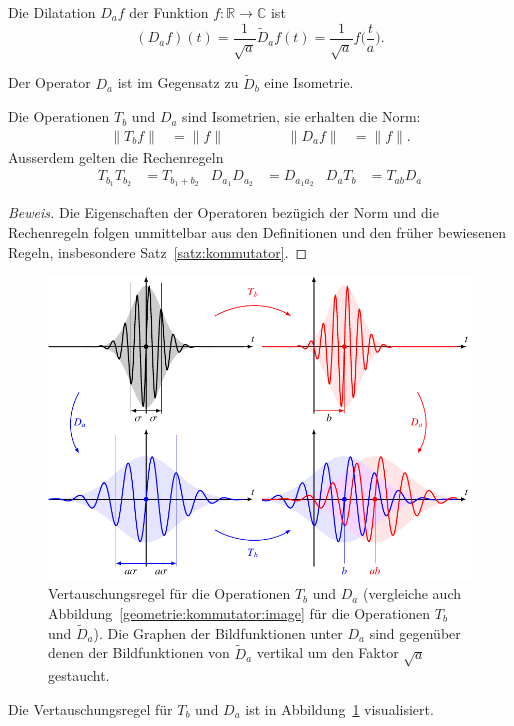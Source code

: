 \begin{definition}
Die Dilatation $D_af$ der Funktion $f\colon\mathbb R\to\mathbb C$ ist 
\[
(D_af)(t)
=
\frac{1}{\sqrt{a}} \tilde{D}_af(t)
=
\frac{1}{\sqrt{a}} f\biggl(\frac{t}{a}\biggr).
\]
\end{definition}
Der Operator $D_a$ ist im Gegensatz zu $\tilde{D}_b$ eine Isometrie.

\begin{satz}
Die Operationen $T_b$ und $D_a$ sind Isometrien, sie erhalten die
Norm:
\[
\begin{aligned}
\|T_bf\| &= \|f\|
&&\qquad&
\|D_af\| &= \|f\|.
\end{aligned}
\]
Ausserdem gelten die Rechenregeln
\begin{align*}
T_{b_1}T_{b_2}&=T_{b_1+b_2}
&
D_{a_1} D_{a_2}&=D_{a_1a_2}
&
D_aT_b
&=
T_{ab}D_a
\end{align*}
\end{satz}

\begin{proof}[Beweis]
Die Eigenschaften der Operatoren bezügich der Norm und die Rechenregeln
folgen unmittelbar aus den Definitionen und
den früher bewiesenen Regeln, insbesondere Satz~\ref{satz:kommutator}.
\end{proof}

\begin{figure}
\centering
\includegraphics{chapters/2-fourier/images/kommutatorD.pdf}
\caption{Vertauschungsregel für die Operationen $T_b$ und $D_a$
(vergleiche auch Abbildung~\ref{geometrie:kommutator:image} für
die Operationen $T_b$ und $\tilde{D}_a$).
Die Graphen der Bildfunktionen unter $D_a$ sind gegenüber denen der
Bildfunktionen von $\tilde{D}_a$ vertikal um den Faktor $\sqrt{a}$
gestaucht.
\label{geometrie:kommutatorD:image}}
\end{figure}

Die Vertauschungsregel für $T_b$ und $D_a$ ist in
Abbildung~\ref{geometrie:kommutatorD:image} visualisiert.





